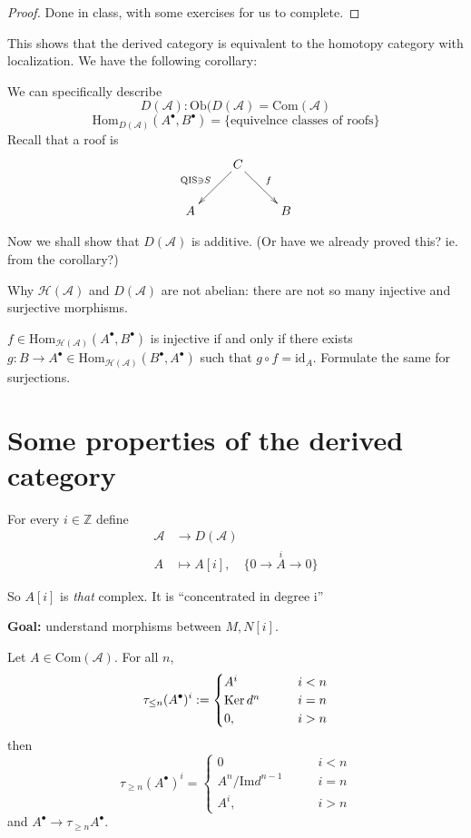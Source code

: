 \begin{proof}
Done in class, with some exercises for us to
complete.
\end{proof}

This shows that the derived category is
equivalent to the homotopy category with
localization. We have the following
corollary:

\begin{corollary}
\label{lemma-}
We can specifically describe
$$
D(\mathcal{A}): \text{Ob}(D(\mathcal{A}) =
\text{Com}(\mathcal{A})
$$
$$
\text{Hom}_{D(\mathcal{A})}(A^{\bullet},
B^{\bullet})
=\{\text{equivelnce classes of roofs}\}
$$
Recall that a roof is
$$
\xymatrix{
& C\ar[dl]_{\text{QIS}\ni S}\ar[dr]^{f}\\
A& & B
}
$$
\end{corollary}

\bigskip\noindent
Now we shall show that $D(\mathcal{A})$ is
additive. (Or have we already proved this?
ie. from the corollary?)

\bigskip\noindent
Why $\mathcal{H}(\mathcal{A})$ and
$D(\mathcal{A})$ are not abelian: there are
not so many injective and surjective
morphisms.

\begin{exercise}
\label{dcos-label-008}
$f \in \text{Hom}_{\mathcal{H}(\mathcal{A})}
(A^{\bullet},B^{\bullet})$ is injective if
and only if there exists  $g: B \to
A^{\bullet} \in
\text{Hom}_{\mathcal{H}(\mathcal{A})}
(B^{\bullet},A^{\bullet})$ such that $g
\circ f=\text{id}_A$. Formulate the same for
surjections.
\end{exercise}

\section{Some properties of the derived
category}
\label{dcos-label-009}

For every $i \in \mathbb{Z}$ define
$$
\begin{aligned}
\mathcal{A} &\longrightarrow D(\mathcal{A})
\\
A &\longmapsto A[i], \quad \{0 \to
\overset{i}{A} \to 0\}
\end{aligned}
$$

So $A[i]$ is {\it that} complex. It is
``concentrated in degree i''

{\bf Goal:} understand morphisms between
$M,N[i]$.

\begin{definition}
\label{definition-embedding-in-Com}
Let $A \in \text{Com}(\mathcal{A})$. For all
$n$,
$$
\tau_{\leq n}(A^{\bullet})^i:=\begin{cases}
A^i\qquad &i<n \\
\mathop{\mathrm{Ker}} d^n\qquad &i=n\\
0,\quad &i>n
\end{cases}
$$
then
$$
\tau_{\geq  n}(A^{\bullet})^i=\begin{cases}
0\qquad
&i<n \\
A^n/\text{Im}d^{n-1}\qquad &i=n\\
A^i,\qquad &i>n
\end{cases}
$$
and $A^{\bullet}\to\tau_{\geq n}A^{\bullet}$.
\end{definition}


